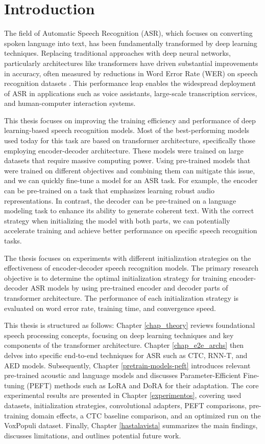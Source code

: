 \chapter{Introduction}

The field of Automatic Speech Recognition (ASR), which focuses on converting spoken language into text, has been fundamentally transformed by deep learning techniques. Replacing traditional approaches with deep neural networks, particularly architectures like transformers \cite{vaswani2017attention} have driven substantial improvements in accuracy, often measured by reductions in Word Error Rate (WER) on speech recognition datasets \cite{Li_2022, KHEDDAR2024102422}. This performance leap enables the widespread deployment of ASR in applications such as voice assistants, large-scale transcription services, and human-computer interaction systems.

This thesis focuses on improving the training efficiency and performance of deep learning-based speech recognition models. Most of the best-performing models used today for this task are based on transformer architecture, specifically those employing encoder-decoder architecture. These models were trained on large datasets that require massive computing power. Using pre-trained models that were trained on different objectives and combining them can mitigate this issue, and we can quickly fine-tune a model for an ASR task. For example, the encoder can be pre-trained on a task that emphasizes learning robust audio representations. In contrast, the decoder can be pre-trained on a language modeling task to enhance its ability to generate coherent text. With the correct strategy when initializing the model with both parts, we can potentially accelerate training and achieve better performance on specific speech recognition tasks.

The thesis focuses on experiments with different initialization strategies on the effectiveness of encoder-decoder speech recognition models.
The primary research objective is to determine the optimal initialization strategy for training encoder-decoder ASR models by using pre-trained encoder and decoder parts of transformer architecture. The performance of each initialization strategy is evaluated on word error rate, training time, and convergence speed. 

This thesis is structured as follows: Chapter \ref{chap_theory} reviews foundational speech processing concepts, focusing on deep learning techniques and key components of the transformer architecture. Chapter \ref{chap_e2e_archs} then delves into specific end-to-end techniques for ASR such as CTC, RNN-T, and AED models. Subsequently, Chapter \ref{pretrain-models-peft} introduces relevant pre-trained acoustic and language models and discusses Parameter-Efficient Fine-tuning (PEFT) methods such as LoRA and DoRA for their adaptation. The core experimental results are presented in Chapter \ref{experimentos}, covering used datasets, initialization strategies, convolutional adapters, PEFT comparisons, pre-training domain effects, a CTC baseline comparison, and an optimized run on the VoxPopuli dataset. Finally, Chapter \ref{hastalavista} summarizes the main findings, discusses limitations, and outlines potential future work.


